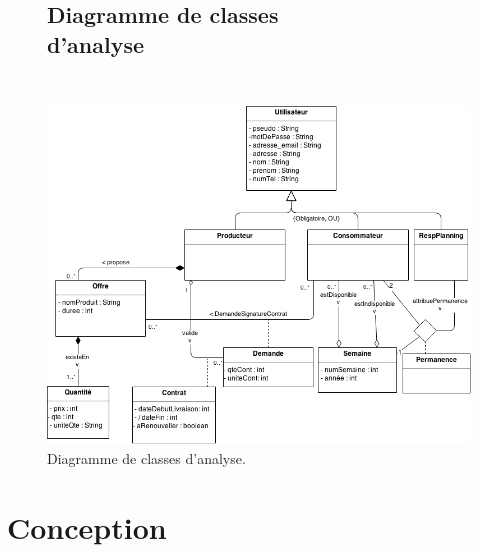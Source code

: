 \documentclass[12pt]{report}
\begin{document}
\clearpage

\begin{figure}[!h]
\centering
\subsection{Diagramme de classes d'analyse~~~~~~~~~~~~~~~~~~~~~~~~~~~~~~~}
\includegraphics[height=.9\textwidth]{./ressources/class_analyse.png}
\caption{Diagramme de classes d'analyse.}
\end{figure}
\clearpage


\section{Conception}
\end{document}
